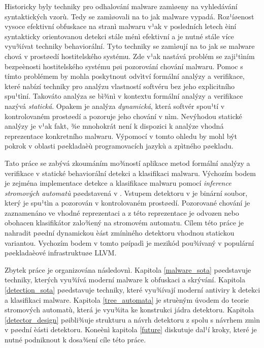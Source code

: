 Historicky byly techniky pro odhalování malware zamìøeny na vyhledávání syntaktických vzorù. Tedy se zamìøovali na to jak malware vypadá. Roz¹íøenost vysoce efektivní obfuskace na stranì malwaru v¹ak v posledních letech èiní syntakticky orientovanou detekci stále ménì efektivní a je nutné stále více vyu¾ívat techniky behaviorální\cite{Moser07}. Tyto techniky se zamìøují na to jak se malware chová v prostøedí hostitelského systému. Zde v¹ak nastává problém se zaji¹tìním bezpeènosti hostitelského systému pøi pozorování chování malwaru. Pomoc s tímto problémem by mohla poskytnout odvìtví formální analýzy a verifikace, které nabízí techniky pro analýzu vlastností softvéru bez jeho explicitního spu¹tìní. Takováto analýza se bì¾nì v kontextu formální analýzy a verifikace nazývá \emph{statická}. Opakem je analýza \emph{dynamická}, která softvér spou¹tí v kontrolovaném prostøedí a pozoruje jeho chování v nìm. Nevýhodou statické analýzy je v¹ak fakt, ¾e mnohokrát není k dispozici k analýze vhodná reprezentace konkretního malwaru. Výpomocí v tomto ohledu by mohl být pokrok v oblasti pøekladaèù programovacích jazykù a zpìtného pøekladu\cite{Durfina11}.

Tato práce se zabývá zkoumáním mo¾ností aplikace metod formální analýzy a verifikace v statické behaviorální detekci a klasifikaci malwaru. Výchozím bodem je zejména implementace detekce a klasifikace malwaru pomocí \emph{inference stromových automatù} pøedstavená v \cite{Babic11}. Vstupem detektoru v \cite{Babic11} je binární soubor, který je spu¹tìn a pozorován v kontrolovaném prostøedí. Pozorované chování je zaznamenáno ve vhodné reprezentaci a z této reprezentace je odvozen nebo obohacen klasifikátor zalo¾ený na stromovém automatu. Cílem této práce je nahradit pøední dynamickou èást zmínìného detektoru vhodnou statickou variantou. Vychozím bodem v tomto pøípadì je mezikód pou¾ívaný v populární pøekladaèové infrastruktuøe LLVM.

Zbytek práce je organizována následovnì. Kapitola \ref{malware_sota} pøedstavuje techniky, kterých vyu¾ívá moderní malware k obfuskaci a skrývání. Kapitola \ref{detection_sota} pøedstavuje techniky, které vyu¾ívají moderní antiviry k detekci a klasifikaci malware. Kapitola \ref{tree_automata} je struèným úvodem do teorie stromových automatù, která je vyu¾ita ke konstrukci jádra detektoru. Kapitola \ref{detector_design} pøibli¾uje strukturu a návrh detektoru z \cite{Babic11} spolu s návrhem zmìn v pøední èásti detektoru. Koneènì kapitola \ref{future} diskutuje dal¹í kroky, které je nutné podniknout k dosa¾ení cíle této práce.

